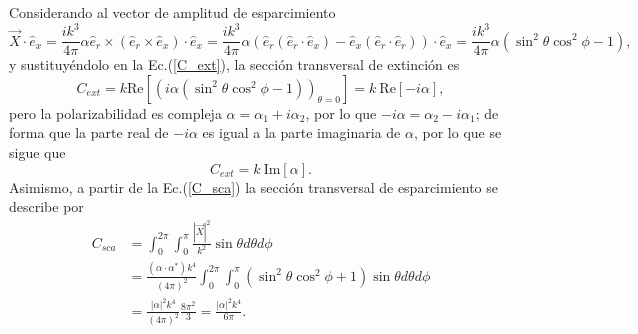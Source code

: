 \noindent Considerando al vector de amplitud de esparcimiento 
\begin{equation*}
	\Vec{X}\cdot\hat{e}_x=\frac{ik^3}{4\pi}\alpha \hat{e}_r\times(\hat{e}_r\times \hat{e}_x)\cdot\hat{e}_x=\frac{ik^3}{4\pi}\alpha\left(\hat{e}_r(\hat{e}_r\cdot \hat{e}_x)-\hat{e}_x(\hat{e}_r\cdot \hat{e}_r)\right)\cdot\hat{e}_x=\frac{ik^3}{4\pi}\alpha(\sin^2\theta\cos^2\phi-1),  
\end{equation*}
y sustituyéndolo en la Ec.(\ref{C_ext}), la sección transversal de extinción es
\begin{equation*}
	C_{ext}=k \mbox{Re}\left[\left(i\alpha(\sin^2\theta\cos^2\phi-1)\right)_{\theta=0}\right]=k\:\mbox{Re}\left[-i\alpha\right],
\end{equation*}
pero la polarizabilidad es compleja $\alpha=\alpha_1+i\alpha_2$, por lo que $-i\alpha=\alpha_2-i\alpha_1$; de forma que la parte real de $-i\alpha$ es igual a la parte imaginaria de $\alpha$, por lo que se sigue que
\begin{equation}
	C_{ext}=k\: \mbox{Im}[\alpha].    
\end{equation}
Asimismo, a partir de la Ec.(\ref{C_sca}) la sección transversal de esparcimiento se describe por
\begin{align}
	C_{sca}&=\int_{0}^{2\pi}\int_0^{\pi}\frac{|\Vec{X}|^2}{k^2}\sin\theta d\theta d\phi\nonumber\\
	&=\frac{(\alpha\cdot\alpha^*)k^4}{(4\pi)^2}\int_0^{2\pi}\int_0^{\pi}(\sin^2\theta\cos^2\phi+1)\sin\theta d\theta d\phi\nonumber\\
	&=\frac{|\alpha|^2k^4}{(4\pi)^2}\frac{8\pi^2}{3}=\frac{|\alpha|^2k^4}{6\pi}.
\end{align}
